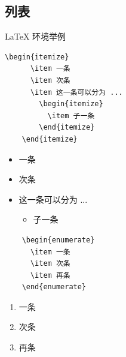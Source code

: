 \subsection{列表}
\begin{frame}[fragile]{\LaTeX{} 环境举例}
    \vspace{1em}
      \begin{minipage}{0.4\linewidth}
        \begin{lstlisting}[basicstyle=\ttfamily\small]
    \begin{itemize}
      \item 一条
      \item 次条
      \item 这一条可以分为 ...
        \begin{itemize}
          \item 子一条
        \end{itemize}
    \end{itemize}\end{lstlisting}
      \end{minipage}\hspace{1.5cm}
      \begin{minipage}{0.4\linewidth}
    \begin{itemize}
      \item 一条
      \item 次条
      \item 这一条可以分为 ...
        \begin{itemize}
          \item 子一条
        \end{itemize}
    \end{itemize}
      \end{minipage}
    
    \begin{minipage}{0.4\linewidth}
    \begin{lstlisting}
    \begin{enumerate}
      \item 一条
      \item 次条
      \item 再条
    \end{enumerate}\end{lstlisting}
      \end{minipage}\hspace{1.5cm}
      \begin{minipage}{0.4\linewidth}
        \vspace{-1cm}
    \begin{enumerate}
      \item 一条
      \item 次条
      \item 再条
    \end{enumerate}
      \end{minipage}
    \end{frame}
    

